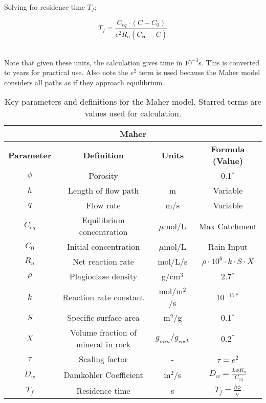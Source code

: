 \begin{tcolorbox}
{\begin{multicols}{2}

Solving for residence time \( T_f \):

\columnbreak
\begin{equation}
    T_f = \frac{C_{eq} \cdot \left(C - C_0\right)}{e^2 R_n \left( C_{\text{eq}} - C \right)}
\end{equation}
\

\end{multicols}

Note that given these units, the calculation gives time in \( 10^{-3} \)s. This is converted to years for practical use. Also note the $e^2$ term is used because the Maher model considers all paths as if they approach equilibrium.

\begin{table}[H]
    \centering
    \begin{tabular}{|c|c|c|c|}
        \hline  %
        \multicolumn{4}{|c|}{\textbf{Maher}} \\  
        \hline
        \textbf{Parameter} & \textbf{Definition} & \textbf{Units} & \textbf{Formula (Value)} \\  
        $\phi$ & Porosity & - & 0.1$^*$ \\
        $h$ & Length of flow path & m & Variable \\
        $q$ & Flow rate & m/s & Variable \\
        $C_{eq}$ & Equilibrium concentration & $\mu$mol/L & Max Catchment \\
        $C_0$ & Initial concentration & $\mu$mol/L & Rain Input \\
        $R_n$ & Net reaction rate & mol/L/s & $\rho \cdot 10^6 \cdot k \cdot S \cdot X $ \\
        $\rho$ & Plagioclase density & g/cm$^3$ & 2.7$^*$ \\
        $k$ & Reaction rate constant & mol/m$^2$/s & 10$^{-15*}$ \\
        $S$ & Specific surface area & m$^2$/g & 0.1$^*$ \\
        $X$ & Volume fraction of mineral in rock & $g_{min}/g_{rock}$& 0.2$^*$ \\
        $\tau$ & Scaling factor & - & $\tau = e^2$ \\
        $D_w$ & Damkohler Coefficient & m$^2$/s & $D_w = \frac{L \phi R_n}{C_{\text{eq}}}$ \\
        $T_f$ & Residence time & s & $T_f = \frac{h \phi}{q}$ \\
        \hline
    \end{tabular}
    \caption{Key parameters and definitions for the Maher model. Starred terms are values used for calculation.}
    \label{tab:parameters4}
\end{table}

\FloatBarrier}




\end{tcolorbox}

